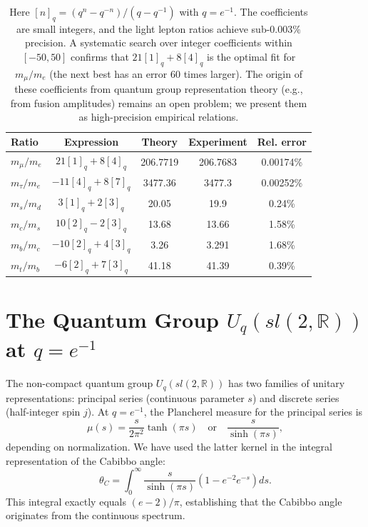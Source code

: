 ﻿\documentclass[twocolumn]{article}
\begin{document}
\begin{table}[htbp]
\centering
\caption{Fermion mass ratios as integer combinations of quantum dimensions \([n]_q\) at \(q=e^{-1}\)}
\begin{tabular}{lcccc}
\toprule
Ratio & Expression & Theory & Experiment & Rel. error \\
\midrule
\(m_\mu/m_e\) & \(21[1]_q + 8[4]_q\) & 206.7719 & 206.7683 & 0.00174\% \\
\(m_\tau/m_e\) & \(-11[4]_q + 8[7]_q\) & 3477.36 & 3477.3 & 0.00252\% \\
\(m_s/m_d\) & \(3[1]_q + 2[3]_q\) & 20.05 & 19.9 & 0.24\% \\
\(m_c/m_s\) & \(10[2]_q - 2[3]_q\) & 13.68 & 13.66 & 1.58\% \\
\(m_b/m_c\) & \(-10[2]_q + 4[3]_q\) & 3.26 & 3.291 & 1.68\% \\
\(m_t/m_b\) & \(-6[2]_q + 7[3]_q\) & 41.18 & 41.39 & 0.39\% \\
\bottomrule
\end{tabular}
\caption*{Here \([n]_q = (q^n - q^{-n})/(q - q^{-1})\) with \(q = e^{-1}\). The coefficients are small integers, and the light lepton ratios achieve sub-\(0.003\%\) precision. A systematic search over integer coefficients within \([-50,50]\) confirms that \(21[1]_q+8[4]_q\) is the optimal fit for \(m_\mu/m_e\) (the next best has an error 60 times larger). The origin of these coefficients from quantum group representation theory (e.g., from fusion amplitudes) remains an open problem; we present them as high-precision empirical relations.}
\end{table}

\section{The Quantum Group \(U_q(sl(2,\mathbb{R}))\) at \(q = e^{-1}\)}
The non-compact quantum group \(U_q(sl(2,\mathbb{R}))\) has two families of unitary representations: principal series (continuous parameter \(s\)) and discrete series (half-integer spin \(j\)). At \(q = e^{-1}\), the Plancherel measure for the principal series is
\[
\mu(s) = \frac{s}{2\pi^2} \tanh(\pi s) \quad \text{or} \quad \frac{s}{\sinh(\pi s)},
\]
depending on normalization. We have used the latter kernel in the integral representation of the Cabibbo angle:
\[
\theta_C = \int_0^\infty \frac{s}{\sinh(\pi s)} \left(1 - e^{-2}e^{-s}\right) ds.
\]
This integral exactly equals \((e-2)/\pi\), establishing that the Cabibbo angle originates from the continuous spectrum.
\end{document}
